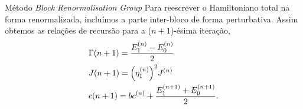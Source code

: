 \documentclass[brazil]{beamer}
\begin{document}
\begin{frame}{Método \textit{Block Renormalisation Group}}
    Para reescrever o Hamiltoniano total na forma renormalizada, incluímos a parte inter-bloco de forma perturbativa.
    Assim obtemos as relações de recursão para a (\( n + 1 \))-ésima iteração,
    \begin{align}
         & \Gamma (n + 1) = \frac{E_1^{(n)} - E_0^{(n)}}{2}                 \\
         & J (n + 1) = \qty( \eta_1^{(n)} )^2 J^{(n)}                       \\
         & c(n + 1) = b c^{(n)} + \frac{E_1^{(n + 1)} + E_0^{(n + 1)}}{2} .
    \end{align}
\end{frame}

\end{document}
